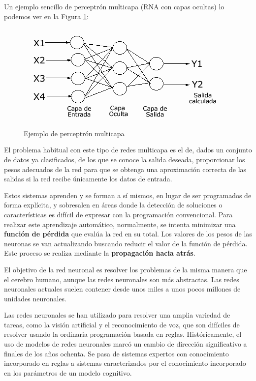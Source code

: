 \documentclass[]{book}
\begin{document}
Un ejemplo sencillo de perceptrón multicapa (RNA con capas ocultas) lo
podemos ver en la Figura \ref{fig:perceptron-multicapa}:

\begin{figure}[H]

{\centering \includegraphics[width=0.4\linewidth]{images/perceptron_multicapa} 

}

\caption{Ejemplo de perceptrón multicapa}\label{fig:perceptron-multicapa}
\end{figure}

El problema habitual con este tipo de redes multicapa es el de, dados un
conjunto de datos ya clasificados, de los que se conoce la salida
deseada, proporcionar los pesos adecuados de la red para que se obtenga
una aproximación correcta de las salidas si la red recibe únicamente los
datos de entrada.

Estos sistemas aprenden y se forman a sí mismos, en lugar de ser
programados de forma explícita, y sobresalen en áreas donde la detección
de soluciones o características es difícil de expresar con la
programación convencional. Para realizar este aprendizaje automático,
normalmente, se intenta minimizar una \textbf{función de pérdida} que
evalúa la red en su total. Los valores de los pesos de las neuronas se
van actualizando buscando reducir el valor de la función de pérdida.
Este proceso se realiza mediante la \textbf{propagación hacia atrás}.

El objetivo de la red neuronal es resolver los problemas de la misma
manera que el cerebro humano, aunque las redes neuronales son más
abstractas. Las redes neuronales actuales suelen contener desde unos
miles a unos pocos millones de unidades neuronales.

Las redes neuronales se han utilizado para resolver una amplia variedad
de tareas, como la visión artificial y el reconocimiento de voz, que son
difíciles de resolver usando la ordinaria programación basada en reglas.
Históricamente, el uso de modelos de redes neuronales marcó un cambio de
dirección significativo a finales de los años ochenta. Se pasa de
sistemas expertos con conocimiento incorporado en reglas a sistemas
caracterizados por el conocimiento incorporado en los parámetros de un
modelo cognitivo.
\end{document}

